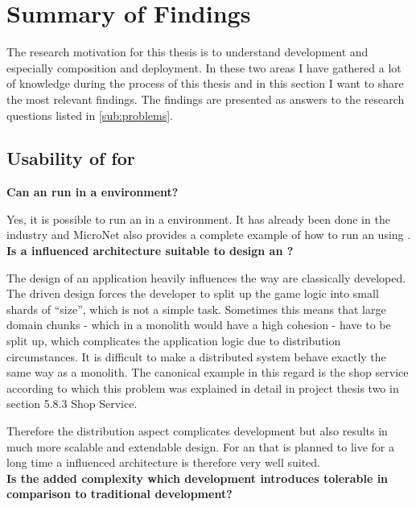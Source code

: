 \section{Summary of Findings}
\label{sub:summary_of_findings}

The research motivation for this thesis is to understand \ms{} development and
especially \ms{} composition and deployment. In these two areas I have gathered
a lot of knowledge during the process of this thesis and in this section I want
to share the most relevant findings. The findings are presented as
answers to the research questions listed in \autoref{sub:problems}.

\subsection{Usability of \mssuc{} for \ogsucuc{}}
\label{sub:usability_ms_og}

\noindent
\textbf{Can an \og{} run in a \ms{} environment?}

Yes, it is possible to run an \og{} in a \ms{} environment. It has already been
done in the industry \cite{pronschinske2015turbine} and MicroNet also
provides a complete example of how to run an \og{} using \mss{}.\\

\noindent
\textbf{Is a \ms{} influenced architecture suitable to design an \og{}?}

The design of an \og{} \ms{} application heavily influences the way \ogs{} are
classically developed. The \ms{} driven design forces the developer to split up
the game logic into small shards of \ms{} ``size'', which is not a simple task.
Sometimes this means that large domain chunks - which in a monolith would
have a high cohesion - have to be split up, which complicates the application
logic due to distribution circumstances. It is difficult to make a distributed system
behave exactly the same way as a monolith. The canonical example in this regard
is the shop service according to which this problem was explained in detail in
project thesis two \cite{biedermann2016project2} in section 5.8.3 Shop Service.

Therefore the distribution aspect complicates development but also results in
much more scalable and extendable design. For an \og{} that is planned to live
for a long time a \ms{} influenced architecture is therefore very well suited.\\

\newpage
\noindent \textbf{ Is the added complexity which \ms{} development
introduces tolerable in comparison to traditional \og{} development?}

